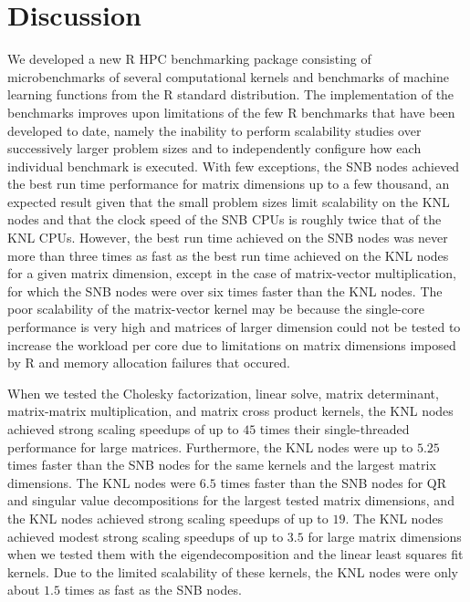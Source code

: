 


\section{Discussion} \label{sec:discuss}
We developed a new R HPC benchmarking package consisting of microbenchmarks of
  several computational kernels and benchmarks of machine learning functions
  from the R standard distribution.
The implementation of the benchmarks improves upon limitations of the few R
  benchmarks that have been developed to date, namely the inability to perform
  scalability studies over successively larger problem sizes and to
  independently configure how each individual benchmark is executed.
With few exceptions, the SNB nodes achieved the best run time
  performance for matrix dimensions up to a few thousand, an expected result
  given that the small problem sizes limit scalability on the KNL nodes
  and that the clock speed of the SNB CPUs is roughly twice that of
  the KNL CPUs.
However, the best run time achieved on the SNB nodes was never more
  than three times as fast as the best run time achieved on the KNL
  nodes for a given matrix dimension, except in the case of matrix-vector
  multiplication, for which the SNB nodes were over six times faster
  than the KNL nodes.
The poor scalability of the matrix-vector kernel may be because the single-core
  performance is very high and matrices of larger dimension could not be
  tested to increase the workload per core due to limitations on matrix dimensions
  imposed by R and memory allocation failures that occured.

When we tested the Cholesky factorization, linear solve, matrix
  determinant, matrix-matrix multiplication, and matrix cross product kernels,
  the KNL nodes achieved strong scaling speedups of up to $45$ times
  their single-threaded performance for large matrices.
Furthermore, the KNL nodes were up to $5.25$ times faster than the SNB nodes
  for the same kernels and the largest matrix dimensions.
The KNL nodes were $6.5$ times faster than the SNB nodes for QR and singular
  value decompositions for the largest tested matrix dimensions, and the KNL
  nodes achieved strong scaling speedups of up to $19$.
The KNL nodes achieved modest strong scaling speedups of up to $3.5$
  for large matrix dimensions when we tested them with the eigendecomposition
  and the linear least squares fit kernels.
Due to the limited scalability of these kernels, the KNL nodes were only about
  $1.5$ times as fast as the SNB nodes.

